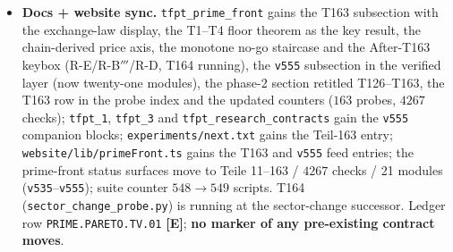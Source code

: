 \documentclass[11pt]{article}
\providecommand{\mE}{\textbf{[E]}}\providecommand{\mC}{\textbf{[C]}}
\begin{document}
\begin{itemize}[leftmargin=1.5em]
T164 (\texttt{sector\_change\_probe.py}), running, tests the successor R-E. NOT RH
evidence; no marker moves.
\item \textbf{Docs + website sync.} \texttt{tfpt\_prime\_front} gains the T163
subsection with the exchange-law display, the T1--T4 floor theorem as the key result,
the chain-derived price axis, the monotone no-go staircase and the After-T163 keybox
(R-E/R-B$'''$/R-D, T164 running), the \texttt{v555} subsection in the verified layer
(now twenty-one modules), the phase-2 section retitled T126--T163, the T163 row in the
probe index and the updated counters ($163$ probes, $4267$ checks);
\texttt{tfpt\_1}, \texttt{tfpt\_3} and \texttt{tfpt\_research\_contracts} gain the
\texttt{v555} companion blocks; \texttt{experiments/next.txt} gains the Teil-163
entry; \texttt{website/lib/primeFront.ts} gains the T163 and \texttt{v555} feed
entries; the prime-front status surfaces move to Teile 11--163 / $4267$ checks / 21
modules (\texttt{v535}--\texttt{v555}); suite counter $548\to549$ scripts. T164
(\texttt{sector\_change\_probe.py}) is running at the sector-change successor. Ledger
row \texttt{PRIME.PARETO.TV.01} \mE; \textbf{no marker of any pre-existing contract
moves}.
\end{itemize}
\end{document}
